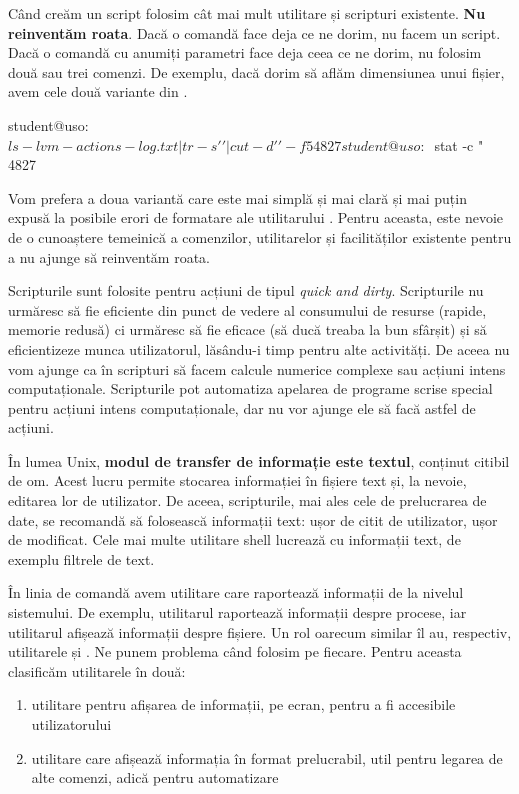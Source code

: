 Când creăm un script folosim cât mai mult utilitare și scripturi existente.
\textbf{Nu reinventăm roata}.
Dacă o comandă face deja ce ne dorim, nu facem un script.
Dacă o comandă cu anumiți parametri face deja ceea ce ne dorim, nu folosim două sau trei comenzi.
De exemplu, dacă dorim să aflăm dimensiunea unui fișier, avem cele două variante din .

\begin{screen}[caption={Afișarea informațiilor despre un fișier (ls vs stat)},label={lst:auto:ls-vs-stat}]
student@uso:~$ ls -l vm-actions-log.txt  | tr -s ' ' | cut -d ' ' -f 5
4827
student@uso:~$ stat -c "%
4827
\end{screen}

Vom prefera a doua variantă care este mai simplă și mai clară și mai puțin expusă la posibile erori de formatare ale utilitarului .
Pentru aceasta, este nevoie de o cunoaștere temeinică a comenzilor, utilitarelor și facilităților existente pentru a nu ajunge să reinventăm roata.

Scripturile sunt folosite pentru acțiuni de tipul \textit{quick and dirty}.
Scripturile nu urmăresc să fie eficiente din punct de vedere al consumului de resurse (rapide, memorie redusă) ci urmăresc să fie eficace (să ducă treaba la bun sfârșit) și să eficientizeze munca utilizatorul, lăsându-i timp pentru alte activități.
De aceea nu vom ajunge ca în scripturi să facem calcule numerice complexe sau acțiuni intens computaționale.
Scripturile pot automatiza apelarea de programe scrise special pentru acțiuni intens computaționale, dar nu vor ajunge ele să facă astfel de acțiuni.

În lumea Unix, \textbf{modul de transfer de informație este textul}, conținut citibil de om.
Acest lucru permite stocarea informației în fișiere text și, la nevoie, editarea lor de utilizator.
De aceea, scripturile, mai ales cele de prelucrarea de date, se recomandă să folosească informații text: ușor de citit de utilizator, ușor de modificat.
Cele mai multe utilitare shell lucrează cu informații text, de exemplu filtrele de text.

În linia de comandă avem utilitare care raportează informații de la nivelul sistemului.
De exemplu, utilitarul  raportează informații despre procese, iar utilitarul  afișează informații despre fișiere.
Un rol oarecum similar îl au, respectiv, utilitarele  și .
Ne punem problema când folosim pe fiecare.
Pentru aceasta clasificăm utilitarele în două:
\begin{enumerate}
  \item utilitare pentru afișarea de informații, pe ecran, pentru a fi accesibile utilizatorului
  \item utilitare care afișează informația în format prelucrabil, util pentru legarea de alte comenzi, adică pentru automatizare
\end{enumerate}

